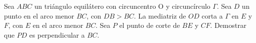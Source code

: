 Sea $ABC$ un triángulo equilátero con circuncentro O y circuncírculo $\Gamma$. Sea $D$ un punto en el arco menor $BC$, con $DB\gt BC$. La mediatriz de $OD$ corta a $\Gamma$ en $E$ y $F$, con $E$ en el arco menor $BC$. Sea $P$ el punto de corte de $BE$ y $CF$. Demostrar que $PD$ es perpendicular a $BC$.